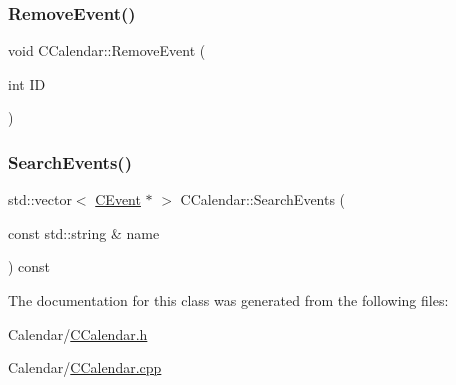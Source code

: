 \mbox{\label{class_c_calendar_aa3fe3ae0f796ea634ba5a52bf1fb5018}} 
\subsubsection{\texorpdfstring{Remove\+Event()}{RemoveEvent()}\hspace{0.1cm}{\footnotesize\ttfamily [2/2]}}
{\footnotesize\ttfamily void C\+Calendar\+::\+Remove\+Event (\begin{DoxyParamCaption}\item[{int}]{ID }\end{DoxyParamCaption})\hspace{0.3cm}{\ttfamily [inline]}}

\mbox{\label{class_c_calendar_a3dd85785e82ba22e18d52458eb767e02}} 
\subsubsection{\texorpdfstring{Search\+Events()}{SearchEvents()}}
{\footnotesize\ttfamily std\+::vector$<$ \mbox{\hyperlink{class_c_event}{C\+Event}} $\ast$ $>$ C\+Calendar\+::\+Search\+Events (\begin{DoxyParamCaption}\item[{const std\+::string \&}]{name }\end{DoxyParamCaption}) const}



The documentation for this class was generated from the following files\+:\begin{DoxyCompactItemize}
\item 
Calendar/\mbox{\hyperlink{_c_calendar_8h}{C\+Calendar.\+h}}\item 
Calendar/\mbox{\hyperlink{_c_calendar_8cpp}{C\+Calendar.\+cpp}}\end{DoxyCompactItemize}
